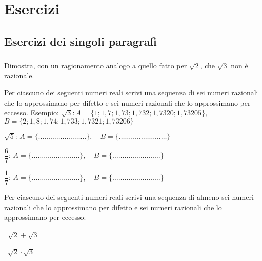 

\section{Esercizi}
\subsection{Esercizi dei singoli paragrafi}
\subsubsection*{}

\begin{esercizio}\label{ese:iper_}
Dimostra, con un ragionamento analogo a quello fatto per $\sqrt 2$, che $\sqrt 
3$ non è razionale.
\end{esercizio}

\begin{esercizio}
\label{ese:1.2}
 Per ciascuno dei seguenti numeri reali scrivi una sequenza di sei numeri 
razionali che lo approssimano per difetto e sei numeri razionali che lo 
approssimano per eccesso. Esempio:
$\sqrt 3$:\,$A=\{1; 1,7; 1,73; 1,732; 1,7320; 1,73205\},$\,$B=\{2; 1,8; 1,74; 
1,733; 1,7321; 1,73206\}$
\begin{enumeratea}
 \item$\sqrt{5}:\, A=\{\ldots\ldots\ldots\ldots\ldots\ldots\ldots\ldots\},\quad 
B=\{\ldots\ldots\ldots\ldots\ldots\ldots\ldots\ldots\}$
 \item$\dfrac{6}{7}:\, 
A=\{\ldots\ldots\ldots\ldots\ldots\ldots\ldots\ldots\},\quad 
B=\{\ldots\ldots\ldots\ldots\ldots\ldots\ldots\ldots\}$
 \item$\dfrac{1}{7}:\, 
A=\{\ldots\ldots\ldots\ldots\ldots\ldots\ldots\ldots\},\quad 
B=\{\ldots\ldots\ldots\ldots\ldots\ldots\ldots\ldots\}$
\end{enumeratea}
\end{esercizio}

\begin{esercizio}
\label{ese:1.3}
 Per ciascuno dei seguenti numeri reali scrivi una sequenza di almeno sei 
numeri razionali che lo approssimano per difetto e sei numeri razionali che lo 
approssimano per eccesso:
\begin{multicols}{2}
\begin{enumeratea}
 \item~$\sqrt {2}+\sqrt {3}$
 \item~$\sqrt {2}\cdot\sqrt {3}$
\end{enumeratea}
\end{multicols}
\end{esercizio}

